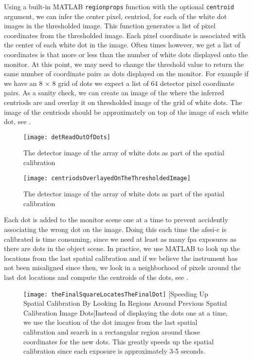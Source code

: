 Using a built-in MATLAB \texttt{regionprops} function with the optional \texttt{centroid} argument, we can infer the center pixel, centriod, for each of the white dot images in the thresholded image. This function generates a list of pixel coordinates from the thresholded image. Each pixel coordinate is associated with the center of each white dot in the image. Often times however, we get a list of coordinates is that more or less than the number of white dots displayed onto the monitor. At this point, we may need to change the threshold value to return the same number of coordinate pairs as dots displayed on the monitor. For example if we have an 8 $\times$ 8 grid of dots we expect a list of 64 detector pixel coordinate pairs. As a sanity check, we can create an image of the where the inferred centriods are and overlay it on thresholded image of the grid of white dots. The image of the centriods should be approximately on top of the image of each white dot, see .

\begin{figure}[h]
\texttt{[image: detReadOutOfDots]}
\centering
\caption{The detector image of the array of white dots as part of the spatial calibration}
\label{fig:detReadOutOfDots}
\end{figure}

\begin{figure}[h]
\texttt{[image: centriodsOverlayedOnTheThresholdedImage]}
\centering
\caption{The detector image of the array of white dots as part of the spatial calibration}
\label{fig:centriodsOverlayedOnTheThresholdedImage}
\end{figure}

Each dot is added to the monitor scene one at a time to prevent accidently associating the wrong dot on the image. Doing this each time the \gls{afssi-c} is calibrated is time consuming, since we need at least as many \gls{fpa} exposures as there are dots in the object scene. In practice, we use MATLAB to look up the locations from the last spatial calibration and if we believe the instrument has not been misaligned since then, we look in a neighborhood of pixels around the last dot locations and compute the centroids of the dots, see .


\begin{figure}[h]
\texttt{[image: theFinalSquareLocatesTheFinalDot]}
\centering
{}[Speeding Up Spatial Calibration By Looking In Regions Around Previous Spatial Calibration Image Dots]{Instead of displaying the dots one at a time, we use the location of the dot images from the last spatial calibration and search in a rectangular region around those coordinates for the new dots. This greatly speeds up the spatial calibration since each exposure is approximately 3-5 seconds.}
\label{fig:theFinalSquareLocatesTheFinalDot}
\end{figure}


